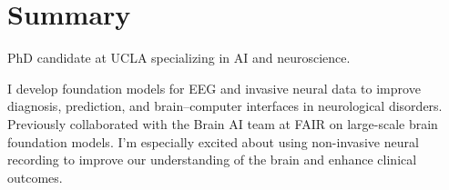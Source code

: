 \section*{Summary}

PhD candidate at UCLA specializing in AI and neuroscience.  

I develop foundation models for EEG and invasive neural data to improve diagnosis, prediction, and brain–computer interfaces in neurological disorders. Previously collaborated with the Brain AI team at FAIR on large-scale brain foundation models. I'm especially excited about using non-invasive neural recording to improve our understanding of the brain and enhance clinical outcomes.
